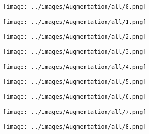 \begin{figure}[H]
  \centering
 \captionsetup[subfigure]{labelformat=empty}
  \begin{subfigure}[b]{0.1\textwidth}
      \centering
      \texttt{[image: ../images/Augmentation/all/0.png]}
  \end{subfigure}
  \hspace{1em}%
  \begin{subfigure}[b]{0.1\textwidth}
      \centering
      \texttt{[image: ../images/Augmentation/all/1.png]}
  \end{subfigure}
  \hspace{1em}%
  \begin{subfigure}[b]{0.1\textwidth}
      \centering
      \texttt{[image: ../images/Augmentation/all/2.png]}
  \end{subfigure}
  \hspace{1em}%
  \begin{subfigure}[b]{0.1\textwidth}
   \centering
   \texttt{[image: ../images/Augmentation/all/3.png]}
 \end{subfigure}
 \hspace{1em}%
 \begin{subfigure}[b]{0.1\textwidth}
   \centering
   \texttt{[image: ../images/Augmentation/all/4.png]}
 \end{subfigure}
 \hspace{1em}%
 \begin{subfigure}[b]{0.1\textwidth}
   \centering
   \texttt{[image: ../images/Augmentation/all/5.png]}
 \end{subfigure}
 \hspace{1em}%
 \begin{subfigure}[b]{0.1\textwidth}
   \centering
   \texttt{[image: ../images/Augmentation/all/6.png]}
 \end{subfigure}
 \hspace{1em}%
 \begin{subfigure}[b]{0.1\textwidth}
  \centering
  \texttt{[image: ../images/Augmentation/all/7.png]}
\end{subfigure}
\hspace{1em}%
 \begin{subfigure}[b]{0.1\textwidth}
 \centering
 \texttt{[image: ../images/Augmentation/all/8.png]}
 \end{subfigure}
 \hspace{1em}%

\end{figure}
